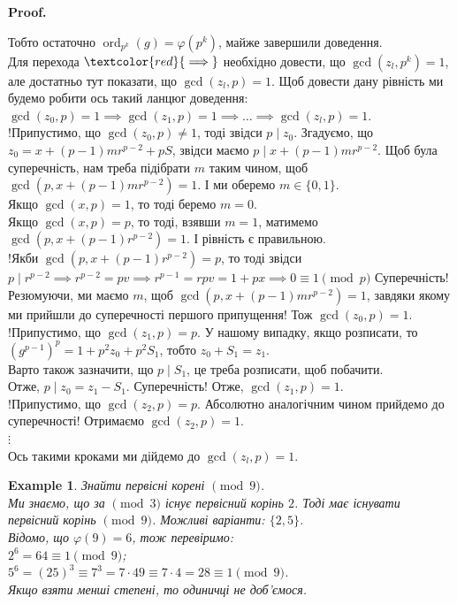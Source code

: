 \documentclass[a4paper, 10pt]{article}
\makeatletter
\theoremstyle{theoremdd}
\theoremstyle{theoremdd}
\theoremstyle{theoremdd}
\theoremstyle{theoremdd}
\newtheorem{example}[theorem]{Example}
\theoremstyle{theoremdd}
\theoremstyle{theoremdd}
\theoremstyle{theoremdd}
\theoremstyle{theoremdd}
\renewenvironment{proof}[1][Proof.\\]{\par
\pushQED{\hfill \qed}%
\normalfont \topsep6\p@\@plus6\p@\relax
\trivlist
\item\relax
{\bfseries
#1\@addpunct{.}}\hspace\labelsep\ignorespaces
}{%
\popQED\endtrivlist\@endpefalse
}
\DeclareMathOperator{\ord}{ord}
\makeatother
\begin{document}
\begin{proof}
Тобто остаточно $\ord_{p^k} (g) = \varphi(p^k)$, майже завершили доведення.
\bigskip \\
Для перехода $\textcolor{red}{\implies}$ необхідно довести, що $\gcd(z_l,p^k) = 1$, але достатньо тут показати, що $\gcd(z_l,p) = 1$. Щоб довести дану рівність ми будемо робити ось такий ланцюг доведення:\\
$\gcd(z_0,p) = 1 \implies \gcd(z_1,p) = 1 \implies \dots \implies \gcd(z_l,p)=1$.\\
!Припустимо, що $\gcd(z_0,p) \neq 1$, тоді звідси $p \mid z_0$. Згадуємо, що\\
$z_0 = x + (p-1)mr^{p-2} + pS$, звідси маємо $p \mid x+(p-1)mr^{p-2}$. Щоб була суперечність, нам треба підібрати $m$ таким чином, щоб \\ $\gcd(p,x+(p-1)mr^{p-2}) = 1$. І ми оберемо $m \in \{0,1\}$.\\
Якщо $\gcd(x,p) = 1$, то тоді беремо $m = 0$.\\
Якщо $\gcd(x,p) = p$, то тоді, взявши $m =1$, матимемо \\ $\gcd(p,x+(p-1)r^{p-2}) = 1$. І рівність є правильною. \\
!Якби $\gcd(p,x+(p-1)r^{p-2}) = p$, то тоді звідси $p \mid r^{p-2} \implies r^{p-2} = pv \implies r^{p-1} = rpv = 1 + px \implies 0 \equiv 1 \pmod p$ Суперечність!\\
Резюмуючи, ми маємо $m$, щоб $\gcd(p,x+(p-1)mr^{p-2}) = 1$, завдяки якому ми прийшли до суперечності першого припущення! Тож $\gcd(z_0,p) = 1$.
\bigskip \\
!Припустимо, що $\gcd(z_1,p) = p$. У нашому випадку, якщо розписати, то\\
$(g^{p-1})^p = 1 + p^2 z_0 + p^2 S_1$, тобто $z_0 + S_1 = z_1$.\\
Варто також зазначити, що $p \mid S_1$, це треба розписати, щоб побачити.\\
Отже, $p \mid z_0 = z_1 - S_1$. Суперечність! Отже, $\gcd(z_1,p) = 1$.\\
!Припустимо, що $\gcd(z_2,p) = p$. Абсолютно аналогічним чином прийдемо до суперечності! Отримаємо $\gcd(z_2,p) = 1$.\\
$\vdots$\\
Ось такими кроками ми дійдемо до $\gcd(z_l,p) = 1$.
\end{proof}

\begin{example}
Знайти первісні корені $\!\! \pmod 9$.\\
Ми знаємо, що за $\!\! \pmod 3$ існує первісний корінь $2$. Тоді має існувати первісний корінь $\!\! \pmod 9$. Можливі варіанти: $\{2,5\}$.\\
Відомо, що $\varphi(9) = 6$, тож перевіримо:\\
$2^6 = 64 \equiv 1 \pmod 9$;\\
$5^6 = (25)^3 \equiv 7^3 = 7 \cdot 49 \equiv 7 \cdot 4 = 28 \equiv 1 \pmod 9$.\\
Якщо взяти менші степені, то одиничці не доб'ємося.
\end{example}
\end{document}
